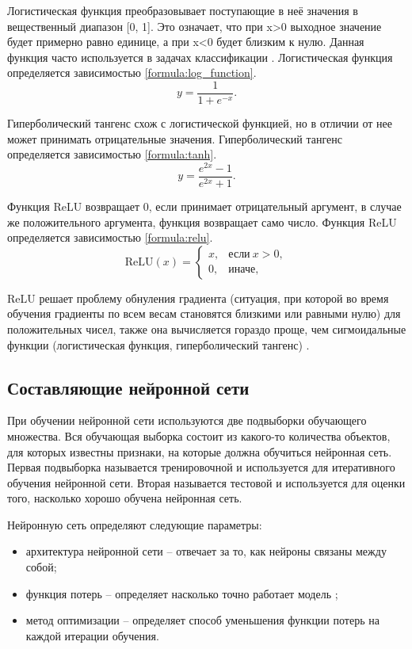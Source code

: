 Логистическая функция преобразовывает поступающие в неё значения в вещественный диапазон [0, 1]. 
Это означает, что при x>0 выходное значение будет примерно равно единице, а при x<0 будет близким к нулю. 
Данная функция часто используется в задачах классификации \cite{activation_function}. 
Логистическая функция определяется зависимостью \ref{formula:log_function}.
\begin{equation}\label{formula:log_function}
y = \frac{1}{1 + e^{-x}}.
\end{equation}

Гиперболический тангенс схож с логистической функцией, но в отличии от нее может принимать отрицательные значения. 
Гиперболический тангенс определяется зависимостью \ref{formula:tanh}.
\begin{equation}\label{formula:tanh}
y = \frac{e^{2x} - 1}{e^{2x} + 1}.
\end{equation}

Функция ReLU возвращает 0, если принимает отрицательный аргумент, в случае же положительного аргумента, функция возвращает само число. 
Функция ReLU определяется зависимостью \ref{formula:relu}.
\begin{equation}\label{formula:relu}
\mathrm{ReLU}(x)=\begin{cases}
x, & \text{если}\ x>0, \\
0, & \text{иначе},
\end{cases}
\end{equation} 

ReLU решает проблему обнуления градиента (ситуация, при которой во время обучения градиенты по всем весам становятся близкими или равными нулю) для положительных чисел, также она вычисляется гораздо проще, чем сигмоидальные функции (логистическая функция, гиперболический тангенс) \cite{activation_function}.

\subsection{Составляющие нейронной сети}
При обучении нейронной сети используются две подвыборки обучающего множества.
Вся обучающая выборка состоит из какого-то количества объектов, для которых известны признаки, на которые должна обучиться нейронная сеть. 
Первая подвыборка называется тренировочной и используется для итеративного обучения нейронной сети. 
Вторая называется тестовой и используется для оценки того, насколько хорошо обучена нейронная сеть.

Нейронную сеть определяют следующие параметры:
\begin{itemize}
	\item архитектура нейронной сети -- отвечает за то, как нейроны связаны между собой;
	\item функция потерь -- определяет насколько точно работает модель \cite{neuro_base};
	\item метод оптимизации -- определяет способ уменьшения функции потерь на каждой итерации обучения.
\end{itemize}

